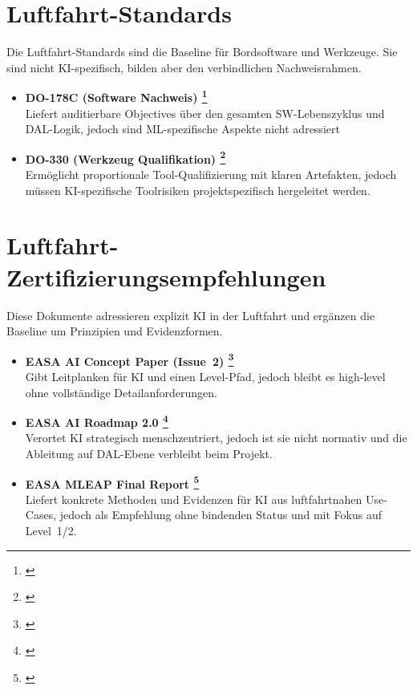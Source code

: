 \section{Luftfahrt-Standards}
Die Luftfahrt-Standards sind die Baseline für Bordsoftware und Werkzeuge. Sie sind 
nicht KI-spezifisch, bilden aber den verbindlichen Nachweisrahmen.

\medskip
\begin{itemize}
  \item \textbf{DO-178C (Software Nachweis) \footnote{ \parencite{do-178c}}} \\
  Liefert auditierbare Objectives über den gesamten SW-Lebenszyklus und DAL-Logik, jedoch sind ML-spezifische Aspekte nicht adressiert
  \item \textbf{DO-330 (Werkzeug Qualifikation) \footnote{ \parencite{do-330}}} \\
  Ermöglicht proportionale Tool-Qualifizierung mit klaren Artefakten, jedoch müssen KI-spezifische Toolrisiken projektspezifisch hergeleitet werden.
\end{itemize}

\section{Luftfahrt-Zertifizierungsempfehlungen}
Diese Dokumente adressieren explizit KI in der Luftfahrt und ergänzen die Baseline um Prinzipien und Evidenzformen.

\medskip
\begin{itemize}
  \item \textbf{EASA AI Concept Paper (Issue~2) \footnote{ \parencite{easa-ai-concept-issue2-2024}}}\\
  Gibt Leitplanken für KI und einen Level-Pfad, jedoch bleibt es high-level ohne vollständige Detailanforderungen.
  \item \textbf{EASA AI Roadmap 2.0 \footnote{ \parencite{easa-ai-roadmap-2-2023}}} \\
  Verortet KI strategisch menschzentriert, jedoch ist sie nicht normativ und die Ableitung auf DAL-Ebene verbleibt beim Projekt.
  \item \textbf{EASA MLEAP Final Report \footnote{ \parencite{easa-mleap-final-2024}}} \\
  Liefert konkrete Methoden und Evidenzen für KI aus luftfahrtnahen Use-Cases, jedoch als Empfehlung ohne bindenden Status und mit Fokus auf Level~1/2.
\end{itemize}

